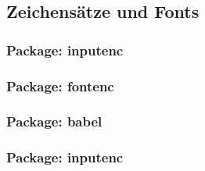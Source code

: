 \subsection{Zeichensätze und Fonts}
\label{sec:ZeichensätzeUndFonts}

\subsubsection{Package: inputenc}

\subsubsection{Package: fontenc}

\subsubsection{Package: babel}

\subsubsection{Package: inputenc}


